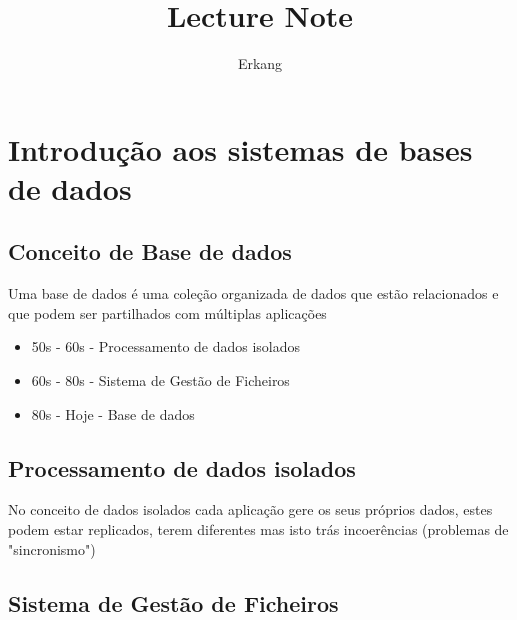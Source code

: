 \documentclass{easyclass}
\begin{document}
\begin{titlepage}
    \title{Lecture Note}
    \author{Erkang}
    \instructor{}
    \maketitle
\end{titlepage}

\tableofcontents
\clearpage

\section{Introdução aos sistemas de bases de dados}

\subsection{Conceito de Base de dados}
Uma base de dados é uma coleção organizada de dados que estão relacionados e que podem ser partilhados com múltiplas aplicações\\
\begin{tcolorbox}[
colframe=blue!25,
colback=blue!10,
coltitle=blue!20!black,  
fonttitle=\bfseries,
adjusted title=Evolução histórica]

\begin{itemize}
\item 50s - 60s   -   Processamento de dados isolados
\item 60s - 80s   -   Sistema de Gestão de Ficheiros
\item 80s - Hoje  -   Base de dados
\end{itemize}





\end{tcolorbox}

\subsection{Processamento de dados isolados}
No conceito de dados isolados cada aplicação gere os seus próprios dados, estes podem estar replicados, terem diferentes mas isto trás incoerências (problemas de "sincronismo")
\subsection{Sistema de Gestão de Ficheiros}

%
\end{document}
